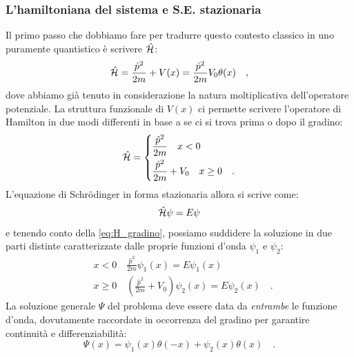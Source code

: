 \subsubsection{L'hamiltoniana del sistema e S.E. stazionaria}
Il primo passo che dobbiamo fare per tradurre questo contesto classico in uno puramente quantistico è scrivere $\hat{\mathcal{H}}$:
\[
    \hat{\mathcal{H}} = \frac{\hat{p}^2}{2m} + V(x) = \frac{\hat{p}^2}{2m} V_0\theta(x) \quad,
\]
dove abbiamo già tenuto in considerazione la natura moltiplicativa dell'operatore potenziale. La struttura funzionale di $V(x)$ ci permette scrivere l'operatore di Hamilton in due modi differenti in base a se ci si trova prima o dopo il gradino:
\begin{equation}
    \hat{\mathcal{H}} = \begin{dcases}
        \frac{\hat{p}^2}{2m} \quad x < 0 \\
        \frac{\hat{p}^2}{2m} + V_0 \quad x \geq 0 \quad.
    \end{dcases}
    \label{eq:H_gradino}
\end{equation}
L'equazione di Schrödinger in forma stazionaria allora si scrive come:
\[
    \hat{\mathcal{H}}\psi = E\psi
\]
e tenendo conto della \eqref{eq:H_gradino}, possiamo suddidere la soluzione in due parti distinte caratterizzate dalle proprie funzioni d'onda $\psi_1$ e $\psi_2$:
\[
    \begin{aligned}
        & x < 0 \quad \frac{\hat{p}^2}{2m} \psi_1(x) = E \psi_1(x)\\
        & x \geq 0 \quad \left(\frac{\hat{p}^2}{2m} + V_0\right)\psi_2(x) = E \psi_2(x) \quad.
    \end{aligned}
\]
La soluzione generale $\Psi$ del problema deve essere data da \emph{entrambe} le funzione d'onda, dovutamente raccordate in occorrenza del gradino per garantire continuità e differenziabilità:
\[
    \Psi(x) = \psi_1(x)\theta(-x) + \psi_2(x)\theta(x) \quad.
\]

